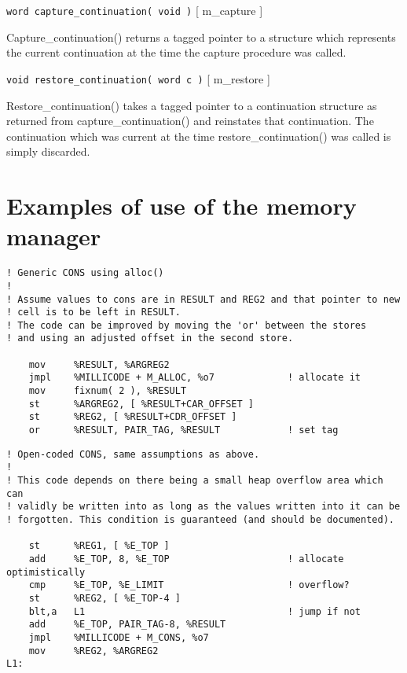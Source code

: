 \begin{description}
\item {{\tt word capture\_continuation( void )} \hfill [ {\sc m\_capture} ]}

Capture\_continuation() returns a tagged pointer to a structure which
represents the current continuation at the time the capture procedure was
called.

\item {{\tt void restore\_continuation( word c )} \hfill [ {\sc m\_restore} ] }

Restore\_continuation() takes a tagged pointer to a continuation structure
as returned from capture\_continuation() and reinstates that continuation.
The continuation which was current at the time restore\_continuation() was
called is simply discarded.

\end{description}

\section{Examples of use of the memory manager}

\begin{verbatim}
! Generic CONS using alloc()
!
! Assume values to cons are in RESULT and REG2 and that pointer to new 
! cell is to be left in RESULT.
! The code can be improved by moving the 'or' between the stores
! and using an adjusted offset in the second store.

    mov     %RESULT, %ARGREG2
    jmpl    %MILLICODE + M_ALLOC, %o7             ! allocate it
    mov     fixnum( 2 ), %RESULT
    st      %ARGREG2, [ %RESULT+CAR_OFFSET ]
    st      %REG2, [ %RESULT+CDR_OFFSET ]
    or      %RESULT, PAIR_TAG, %RESULT            ! set tag
\end{verbatim}

\begin{verbatim}
! Open-coded CONS, same assumptions as above.
!
! This code depends on there being a small heap overflow area which can
! validly be written into as long as the values written into it can be
! forgotten. This condition is guaranteed (and should be documented).

    st      %REG1, [ %E_TOP ]
    add     %E_TOP, 8, %E_TOP                     ! allocate optimistically
    cmp     %E_TOP, %E_LIMIT                      ! overflow?
    st      %REG2, [ %E_TOP-4 ]
    blt,a   L1                                    ! jump if not
    add     %E_TOP, PAIR_TAG-8, %RESULT
    jmpl    %MILLICODE + M_CONS, %o7
    mov     %REG2, %ARGREG2
L1:
\end{verbatim}


